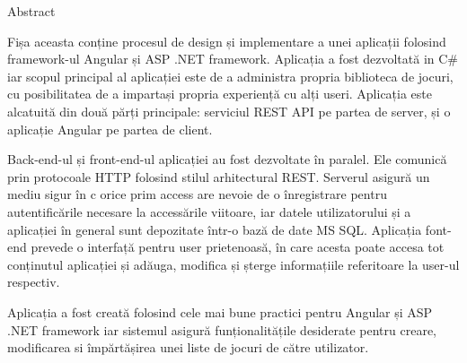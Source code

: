Abstract

Fișa aceasta conține procesul de design și implementare a unei aplicații folosind framework-ul Angular și ASP .NET framework. Aplicația a fost dezvoltată in C# iar scopul principal al aplicației este de a administra propria biblioteca de jocuri, cu posibilitatea de a impartași propria experiență cu alți useri. Aplicația este alcatuită din două părți principale: serviciul REST API pe partea de server, și o aplicație Angular pe partea de client.

Back-end-ul și front-end-ul aplicației au fost dezvoltate în paralel. Ele comunică prin protocoale HTTP folosind stilul arhitectural REST. Serverul asigură un mediu sigur în c orice prim access are nevoie de o înregistrare pentru autentificările necesare la accessările viitoare, iar datele utilizatorului și a aplicației în general sunt depozitate într-o bază de date MS SQL. Aplicația font-end prevede o interfață pentru user prietenoasă, în care acesta poate accesa tot conținutul aplicației și adăuga, modifica și șterge informațiile referitoare la user-ul respectiv.

Aplicația a fost creată folosind cele mai bune practici pentru Angular și ASP .NET framework iar sistemul asigură funționalitățile desiderate pentru creare, modificarea si împărtășirea unei liste de jocuri de către utilizator.
